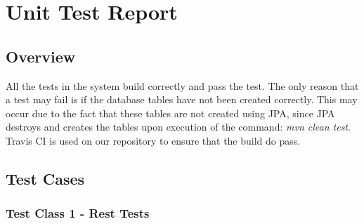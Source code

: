 \documentclass[11pt,a4paper]{article}
\begin{document}
\section{Unit Test Report}
\subsection{Overview}
All the tests in the system build correctly and pass the test. The only reason that a test may fail is if the database tables have not been created correctly. This may occur due to the fact that these tables are not created using JPA, since JPA destroys and creates the tables upon execution of the command: \textit{mvn clean test}. Travis CI is used on our repository to ensure that the build do pass.

\subsection{Test Cases}

\subsubsection{Test Class 1 - Rest Tests}
\end{document}
